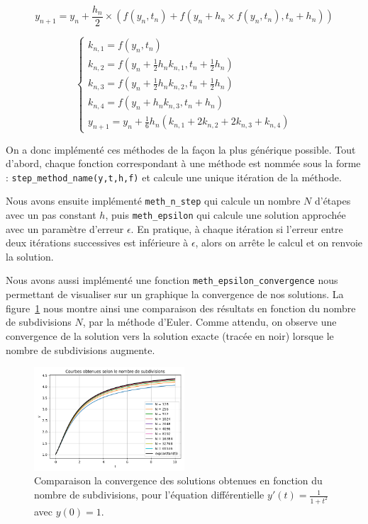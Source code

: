 \begin{equation}
		y_{n+1} = y_n + \frac{h_n}{2} \times (f(y_n, t_n) + f(y_n + h_n \times f(y_n, t_n), t_n + h_n))
	\label{eq:heun}
\end{equation}

\begin{equation}
	\begin{cases}
		k_{n, 1} = f(y_n, t_n)\\
		k_{n, 2} = f(y_n + \frac{1}{2} h_n k_{n, 1}, t_n + \frac{1}{2}h_n)\\
		k_{n, 3} = f(y_n + \frac{1}{2} h_n k_{n, 2}, t_n + \frac{1}{2}h_n)\\
		k_{n, 4} = f(y_n + h_n k_{n, 3}, t_n + h_n)\\
		y_{n+1} = y_n + \frac{1}{6} h_n (k_{n, 1} + 2k_{n, 2} + 2k_{n, 3} + k_{n, 4})
	\end{cases}
	\label{eq:runge-kutta}
\end{equation}

On a donc implémenté ces méthodes de la façon la plus générique possible. Tout d'abord, 
chaque fonction correspondant à une méthode est nommée sous la forme : \texttt{step\_method\_name(y,t,h,f)} et calcule
une unique itération de la méthode.

Nous avons ensuite implémenté \texttt{meth\_n\_step} qui calcule un nombre $N$ d'étapes avec un pas constant $h$,
puis \texttt{meth\_epsilon} qui calcule une solution approchée avec un paramètre d’erreur $\epsilon$.
En pratique, à chaque itération si l'erreur entre deux itérations successives est inférieure à $\epsilon$,
alors on arrête le calcul et on renvoie la solution.

Nous avons aussi implémenté une fonction \texttt{meth\_epsilon\_convergence} nous permettant de visualiser
sur un graphique la convergence de nos solutions.
La figure~\ref{fig:subdivision} nous montre ainsi une comparaison des résultats en fonction
du nombre de subdivisions $N$, par la méthode d'Euler.
Comme attendu, on observe une convergence de la solution vers la solution exacte (tracée en noir)
lorsque le nombre de subdivisions augmente.

\begin{figure}[htbp!]
	\centering
	\includegraphics[width=0.5\textwidth]{res/subdivisions}
	\caption{Comparaison la convergence des solutions obtenues en fonction du nombre de subdivisions, pour l'équation différentielle $y'(t) = \frac{1}{1 + t^2}$ avec $y(0) = 1$.}
	\label{fig:subdivision}
\end{figure}

